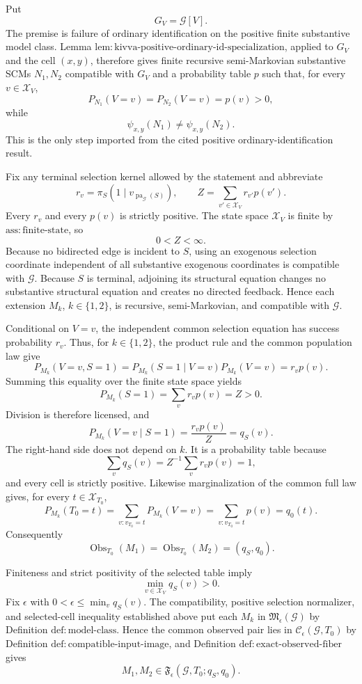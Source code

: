 Put
\[
 G_V=\mathcal G[V].
\]
The premise is failure of ordinary identification on the positive finite substantive model class. Lemma \(\mathrm{lem{:}kivva\text{-}positive\text{-}ordinary\text{-}id\text{-}specialization}\), applied to \(G_V\) and the cell \((x,y)\), therefore gives finite recursive semi-Markovian substantive SCMs \(N_1,N_2\) compatible with \(G_V\) and a probability table \(p\) such that, for every \(v\in\mathcal X_V\),
\[
 P_{N_1}(V=v)=P_{N_2}(V=v)=p(v)>0,
\]
while
\[
 \psi_{x,y}(N_1)\ne\psi_{x,y}(N_2).
\]
This is the only step imported from the cited positive ordinary-identification result.

Fix any terminal selection kernel allowed by the statement and abbreviate
\[
 r_v=\pi_S(1\mid v_{\operatorname{pa}_{\mathcal G}(S)}),
 \qquad
 Z=\sum_{v'\in\mathcal X_V}r_{v'}p(v').
\]
Every \(r_v\) and every \(p(v)\) is strictly positive. The state space \(\mathcal X_V\) is finite by \(\mathrm{ass{:}finite\text{-}state}\), so
\[
 0<Z<\infty.
\]
Because no bidirected edge is incident to \(S\), using an exogenous selection coordinate independent of all substantive exogenous coordinates is compatible with \(\mathcal G\). Because \(S\) is terminal, adjoining its structural equation changes no substantive structural equation and creates no directed feedback. Hence each extension \(M_k\), \(k\in\{1,2\}\), is recursive, semi-Markovian, and compatible with \(\mathcal G\).

Conditional on \(V=v\), the independent common selection equation has success probability \(r_v\). Thus, for \(k\in\{1,2\}\), the product rule and the common population law give
\[
 P_{M_k}(V=v,S=1)
 =P_{M_k}(S=1\mid V=v)P_{M_k}(V=v)
 =r_vp(v).
\]
Summing this equality over the finite state space yields
\[
 P_{M_k}(S=1)=\sum_v r_vp(v)=Z>0.
\]
Division is therefore licensed, and
\[
 P_{M_k}(V=v\mid S=1)
 =\frac{r_vp(v)}{Z}
 =q_S(v).
\]
The right-hand side does not depend on \(k\). It is a probability table because
\[
 \sum_vq_S(v)=Z^{-1}\sum_vr_vp(v)=1,
\]
and every cell is strictly positive. Likewise marginalization of the common full law gives, for every \(t\in\mathcal X_{T_0}\),
\[
 P_{M_k}(T_0=t)
 =\sum_{v:v_{T_0}=t}P_{M_k}(V=v)
 =\sum_{v:v_{T_0}=t}p(v)
 =q_0(t).
\]
Consequently
\[
 \operatorname{Obs}_{T_0}(M_1)
 =\operatorname{Obs}_{T_0}(M_2)
 =(q_S,q_0).
\]

Finiteness and strict positivity of the selected table imply
\[
 \min_{v\in\mathcal X_V}q_S(v)>0.
\]
Fix \(\epsilon\) with \(0<\epsilon\leq\min_vq_S(v)\). The compatibility, positive selection normalizer, and selected-cell inequality established above put each \(M_k\) in \(\mathfrak M_\epsilon(\mathcal G)\) by Definition \(\mathrm{def{:}model\text{-}class}\). Hence the common observed pair lies in \(\mathcal C_\epsilon(\mathcal G,T_0)\) by Definition \(\mathrm{def{:}compatible\text{-}input\text{-}image}\), and Definition \(\mathrm{def{:}exact\text{-}observed\text{-}fiber}\) gives
\[
 M_1,M_2\in\mathfrak F_\epsilon(\mathcal G,T_0;q_S,q_0).
\]

